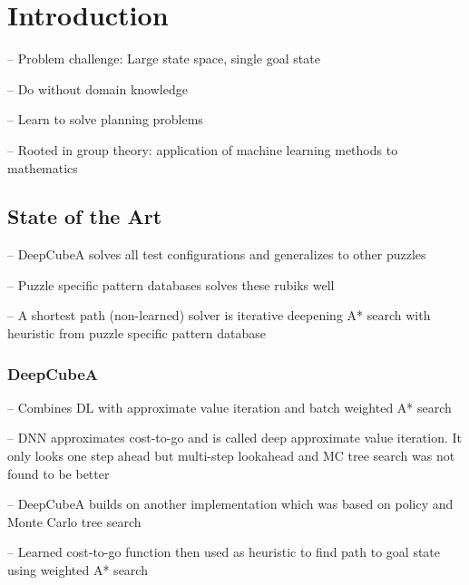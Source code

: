 \documentclass[../main.tex]{subfiles}
\begin{document}
\chapter{Introduction}
\cite{SolvingNature}
-- Problem challenge: Large state space, single goal state 

-- Do without domain knowledge

-- Learn to solve planning problems

-- Rooted in group theory: application of machine learning methods to mathematics


\section{State of the Art}
\cite{SolvingNature}
-- DeepCubeA solves all test configurations and generalizes to other puzzles

-- Puzzle specific pattern databases solves these rubiks well

-- A shortest path (non-learned) solver is iterative deepening A* search with heuristic from puzzle specific pattern database

\subsection{DeepCubeA}
\cite{SolvingNature}
-- Combines DL with approximate value iteration and batch weighted A* search

-- DNN approximates cost-to-go and is called deep approximate value iteration. It only looks one step ahead but multi-step lookahead  and MC tree search was not found to be better

-- DeepCubeA builds on another implementation which was based on policy and Monte Carlo tree search 

-- Learned cost-to-go function then used as heuristic to find path to goal state using weighted A* search

\end{document}
